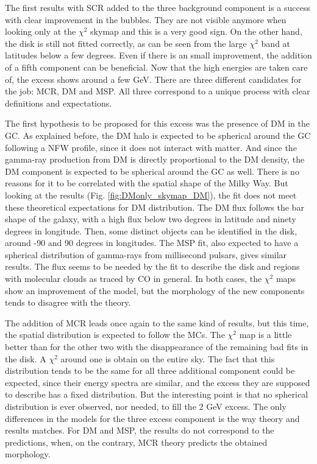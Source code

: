 The first results with SCR added to the three background component is a success with clear improvement in the bubbles. They are not visible anymore when looking only at the $\chi^2$ skymap and this is a very good sign. On the other hand, the disk is still not fitted correctly, as can be seen from the large $\chi^2$ band at latitudes below a few degrees. Even if there is an small improvement, the addition of a fifth component can be beneficial.
Now that the high energies are taken care of, the excess shows around a few GeV. There are three different candidates for the job: MCR, DM and MSP. All three correspond to a unique process with clear definitions and expectations.



The first hypothesis to be proposed for this excess was the presence of DM in the GC. As explained before, the DM halo is expected to be spherical around the GC following a NFW profile, since it does not interact with matter. And since the gamma-ray production from DM is directly proportional to the DM density, the DM component is expected to be spherical around the GC as well. There is no reasons for it to be correlated with the spatial shape of the Milky Way. But looking at the results (Fig. \ref{fig:DMonly_skymap_DM}), the fit does not meet these theoretical expectations for DM distribution. The DM flux follows the bar shape of the galaxy, with a high flux below two degrees in latitude and ninety degrees in longitude. Then, some distinct objects can be identified in the disk, around -90 and 90 degrees in longitudes.
The MSP fit, also expected to have a spherical distribution of gamma-rays from millisecond pulsars, gives similar results. The flux seems to be needed by the fit to describe the disk and regions with molecular clouds as traced by CO in general.
In both cases, the $\chi^2$ maps show an improvement of the model, but the morphology of the new components tends to disagree with the theory.




The addition of MCR leads once again to the same kind of results, but this time, the spatial distribution is expected to follow the MCs. The $\chi^2$ map is a little better than for the other two with the disappearance of the remaining bad fits in the disk. A $\chi^2$ around one is obtain on the entire sky. 
The fact that this distribution tends to be the same for all three additional component could be expected, since their energy spectra are similar, and the excess they are supposed to describe has a fixed distribution. But the interesting point is that no spherical distribution is ever observed, nor needed, to fill the 2 GeV excess. 
The only differences in the models for the three excess component is the way theory and results matches. For DM and MSP, the results do not correspond to the predictions, when, on the contrary, MCR theory predicts the obtained morphology.

